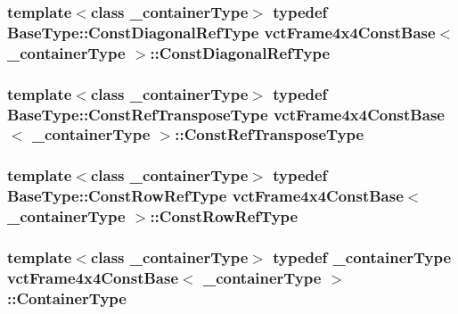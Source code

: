 \hypertarget{classvct_frame4x4_const_base_a83c846e0b484264c6d71c101b67d164a}{
\subsubsection[{Const\-Diagonal\-Ref\-Type}]{\setlength{\rightskip}{0pt plus 5cm}template$<$class \-\_\-container\-Type$>$ typedef Base\-Type\-::\-Const\-Diagonal\-Ref\-Type {\bf vct\-Frame4x4\-Const\-Base}$<$ \-\_\-container\-Type $>$\-::{\bf Const\-Diagonal\-Ref\-Type}}}\label{classvct_frame4x4_const_base_a83c846e0b484264c6d71c101b67d164a}
\hypertarget{classvct_frame4x4_const_base_acac151b2d8a361ed229d8cdacac2b01f}{
\subsubsection[{Const\-Ref\-Transpose\-Type}]{\setlength{\rightskip}{0pt plus 5cm}template$<$class \-\_\-container\-Type$>$ typedef Base\-Type\-::\-Const\-Ref\-Transpose\-Type {\bf vct\-Frame4x4\-Const\-Base}$<$ \-\_\-container\-Type $>$\-::{\bf Const\-Ref\-Transpose\-Type}}}\label{classvct_frame4x4_const_base_acac151b2d8a361ed229d8cdacac2b01f}
\hypertarget{classvct_frame4x4_const_base_af18cadccba2812e0d3cad82f43583ab0}{
\subsubsection[{Const\-Row\-Ref\-Type}]{\setlength{\rightskip}{0pt plus 5cm}template$<$class \-\_\-container\-Type$>$ typedef Base\-Type\-::\-Const\-Row\-Ref\-Type {\bf vct\-Frame4x4\-Const\-Base}$<$ \-\_\-container\-Type $>$\-::{\bf Const\-Row\-Ref\-Type}}}\label{classvct_frame4x4_const_base_af18cadccba2812e0d3cad82f43583ab0}
\hypertarget{classvct_frame4x4_const_base_ac8b3e3540ee9e065a519d7b364276662}{
\subsubsection[{Container\-Type}]{\setlength{\rightskip}{0pt plus 5cm}template$<$class \-\_\-container\-Type$>$ typedef \-\_\-container\-Type {\bf vct\-Frame4x4\-Const\-Base}$<$ \-\_\-container\-Type $>$\-::{\bf Container\-Type}}}\label{classvct_frame4x4_const_base_ac8b3e3540ee9e065a519d7b364276662}
